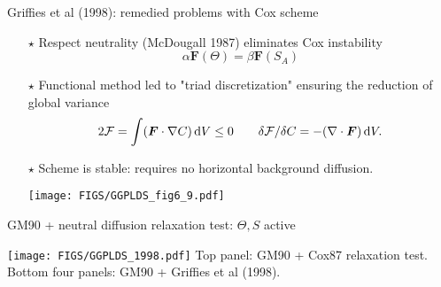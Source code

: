 \documentclass{beamer}
\begin{document}
\begin{frame}{Griffies et al (1998): remedied problems with Cox scheme}

\begin{itemize}
 \item[$\star$] Respect neutrality (McDougall 1987) eliminates Cox instability 
 \begin{equation}
     \alpha {\bm F}(\Theta) = \beta {\bm F}(S_{A})
 \end{equation}

 
 \item[$\star$] Functional method led to "triad discretization" ensuring the reduction of global variance
 \begin{align}
     2 {\cal F} = \int ({\bm F} \cdot \nabla C) \, \mathrm{d}V
     \le 0 
    \qquad 
    \delta {\cal F}/\delta C 
     = -(\nabla \cdot {\bm F}) \, \mathrm{d}V.
 \end{align}
 
\item[$\star$] Scheme is stable: requires no horizontal background diffusion. 
 
\begin{center}
\texttt{[image: FIGS/GGPLDS\_fig6\_9.pdf]}
\end{center}
 
\end{itemize}

\end{frame}


\begin{frame}{GM90 + neutral diffusion relaxation test: $\Theta,S$ active}

\begin{center}
\texttt{[image: FIGS/GGPLDS\_1998.pdf]}
\newline 
{\scriptsize Top panel: GM90 + Cox87 relaxation test. Bottom four panels: GM90 + Griffies et al (1998).}
\end{center}

\end{frame}
\end{document}

